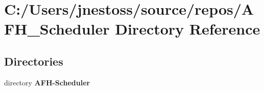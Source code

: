 \section{C\+:/\+Users/jnestoss/source/repos/\+A\+F\+H\+\_\+\+Scheduler Directory Reference}
\label{dir_cb6be1ed65e0677a41d0c101d892bf7e}
\subsection*{Directories}
\begin{DoxyCompactItemize}
\item 
directory \textbf{ A\+F\+H-\/\+Scheduler}
\end{DoxyCompactItemize}

